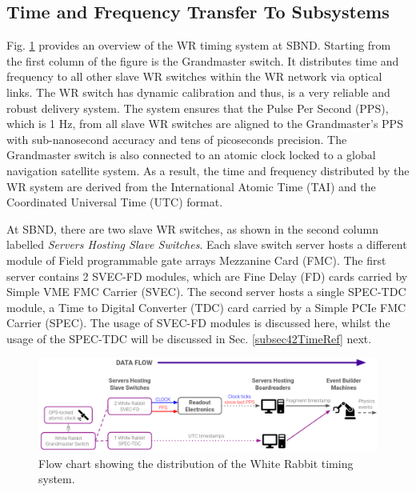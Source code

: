

\subsection{Time and Frequency Transfer To Subsystems}
\label{subsec41TimeRef}

Fig. \ref{fig:timeTransfer} provides an overview of the WR timing system at SBND.
Starting from the first column of the figure is the Grandmaster switch.
It distributes time and frequency to all other slave WR switches within the WR network via optical links.
The WR switch has dynamic calibration and thus, is a very reliable and robust delivery system.
The system ensures that the Pulse Per Second (PPS), which is 1 Hz, from all slave WR switches are aligned to the Grandmaster's PPS with sub-nanosecond accuracy and tens of picoseconds precision.
The Grandmaster switch is also connected to an atomic clock locked to a global navigation satellite system.
As a result, the time and frequency distributed by the WR system are derived from the International Atomic Time (TAI) and the Coordinated Universal Time (UTC) format.

At SBND, there are two slave WR switches, as shown in the second column labelled \textit{Servers Hosting Slave Switches}.
Each slave switch server hosts a different module of Field programmable gate arrays Mezzanine Card (FMC).
The first server contains 2 SVEC-FD modules, which are Fine Delay (FD) cards carried by Simple VME FMC Carrier (SVEC).
The second server hosts a single SPEC-TDC module, a Time to Digital Converter (TDC) card carried by a Simple PCIe FMC Carrier (SPEC).
The usage of SVEC-FD modules is discussed here, whilst the usage of the SPEC-TDC will be discussed in Sec. \ref{subsec42TimeRef} next.

\begin{figure}[b!] 
\centering    
\includegraphics[width=1.0\textwidth]{time_transfer}
\caption[White Rabbit Timing System Flow Chart]{
Flow chart showing the distribution of the White Rabbit timing system.
}
\label{fig:timeTransfer}
\end{figure}

